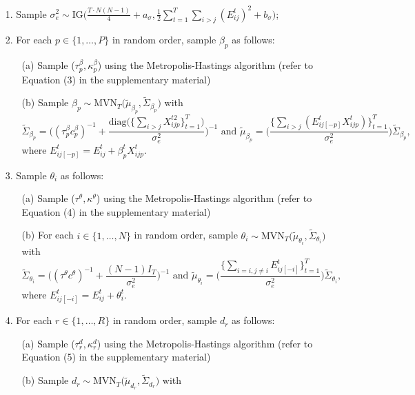 \documentclass[a4paper]{article}
\begin{document}
	\begin{itemize}
		\item [1.] Sample $\sigma_e^2 \sim \mbox{IG}\big(\frac{T\cdot N(N-1)}{4}+a_\sigma, \frac{1}{2}\sum\limits_{t=1}^T\sum\limits_{i> j}(E^t_{ij})^2 + b_\sigma\big)$;
		\item [2.] For each $p \in \{1,\ldots,P\}$ in random order, sample $\beta_{p}$ as follows:
		\begin{enumerate} 
			\item [(a)] Sample ($\tau^{\beta}_p ,  \kappa^\beta_p$) using the Metropolis-Hastings algorithm (refer to Equation (3) in the supplementary material)
			\item [(b)] Sample $\beta_{p} \sim \mbox{MVN}_T\big(\tilde{\mu}_{\beta_p}, \tilde{\Sigma}_{\beta_p} \big)$ with 
			$$\tilde{\Sigma}_{\beta_p} = \Big((\tau^{\beta}_pc^\beta_p)^{-1}+\frac{\mbox{diag}\big(\{\sum_{i>j}{X^{t2}_{ijp}}\}_{t=1}^{T}\big)}{\sigma_e^2}\Big)^{-1} \mbox{ and } \tilde{\mu}_{\beta_p} =  \Big(\frac{\{\sum_{i>j}(E^{t}_{ij[-p]}X^t_{ijp})\}_{t=1}^{T}}{\sigma_e^2}\Big)\tilde{\Sigma}_{\beta_p},$$ 
			where $E^{t}_{ij[-p]}=E^t_{ij}+\beta^t_{p}X^{t}_{ijp}$.						
		\end{enumerate}
		\item [3.] Sample $\theta_{i}$ as follows:
		\begin{enumerate}
			\item [(a)] Sample ($\tau^{\theta},  \kappa^\theta$) using the Metropolis-Hastings algorithm (refer to Equation (4) in the supplementary material)
			\item [(b)] For each $i \in \{1,\ldots,N\}$ in random order, sample $\theta_{i} \sim \mbox{MVN}_T\big(\tilde{\mu}_{\theta_i}, \tilde{\Sigma}_{\theta_i} \big)$ with
			$$\tilde{\Sigma}_{\theta_i} = \Big((\tau^\theta c^\theta)^{-1}+\frac{(N-1)I_T}{\sigma_e^2}\Big)^{-1} \mbox{ and }
			\tilde{\mu}_{\theta_i} = \Big(\frac{\{\sum_{i=i, j\neq i}E^{t}_{ij[-i]}\}_{t=1}^{T}}{\sigma_e^2}\Big)\tilde{\Sigma}_{\theta_i},$$ where $E^{t}_{ij[-i]}=E^t_{ij}+\theta^t_{i}.$
		\end{enumerate}
		\item [4.] For each $r \in \{1,\ldots,R\}$ in random order, sample $d_{r}$ as follows:
		\begin{enumerate}
			\item [(a)] Sample  ($\tau_r^{d},  \kappa_r^d$) using the Metropolis-Hastings algorithm (refer to Equation (5) in the supplementary material)
			\item [(b)] Sample $d_{r} \sim \mbox{MVN}_T\big(\tilde{\mu}_{d_r}, \tilde{\Sigma}_{d_r} \big)$ with

\end{enumerate}
\end{itemize}
\end{document}
